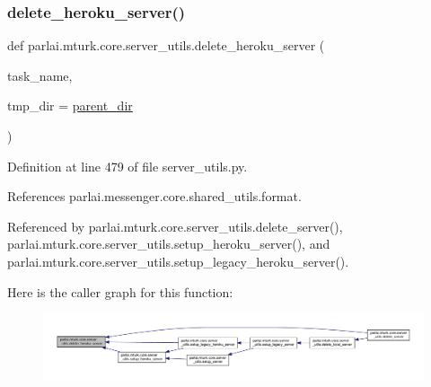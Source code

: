 \subsubsection{\texorpdfstring{delete\+\_\+heroku\+\_\+server()}{delete\_heroku\_server()}}
{\footnotesize\ttfamily def parlai.\+mturk.\+core.\+server\+\_\+utils.\+delete\+\_\+heroku\+\_\+server (\begin{DoxyParamCaption}\item[{}]{task\+\_\+name,  }\item[{}]{tmp\+\_\+dir = {\ttfamily \hyperlink{namespaceparlai_1_1mturk_1_1core_1_1server__utils_a193439bdbc25a32b00f1a43e6f8532d8}{parent\+\_\+dir}} }\end{DoxyParamCaption})}



Definition at line 479 of file server\+\_\+utils.\+py.



References parlai.\+messenger.\+core.\+shared\+\_\+utils.\+format.



Referenced by parlai.\+mturk.\+core.\+server\+\_\+utils.\+delete\+\_\+server(), parlai.\+mturk.\+core.\+server\+\_\+utils.\+setup\+\_\+heroku\+\_\+server(), and parlai.\+mturk.\+core.\+server\+\_\+utils.\+setup\+\_\+legacy\+\_\+heroku\+\_\+server().

Here is the caller graph for this function\+:
\nopagebreak
\begin{figure}[H]
\begin{center}
\leavevmode
\includegraphics[width=350pt]{namespaceparlai_1_1mturk_1_1core_1_1server__utils_a8dfde882f9d6ff492ca565ae2334fc70_icgraph}
\end{center}
\end{figure}
\mbox{\label{namespaceparlai_1_1mturk_1_1core_1_1server__utils_a9b4f4c3f696be001c2fa96b3690af83c}} 
